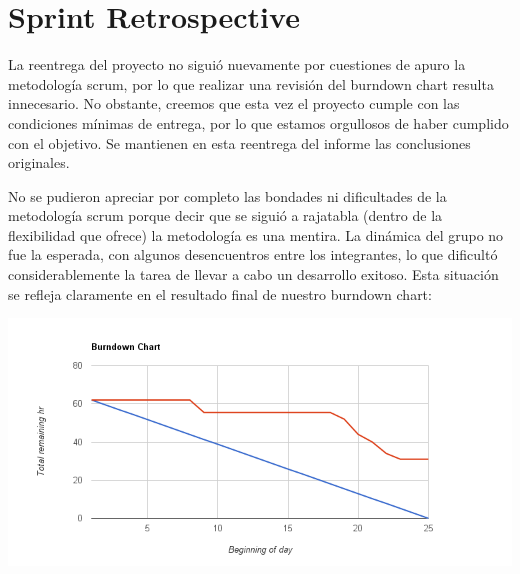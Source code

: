 \section{Sprint Retrospective}
La reentrega del proyecto no siguió nuevamente por cuestiones de apuro la metodología scrum, por lo que realizar una revisión del burndown chart resulta innecesario. No obstante, creemos que esta vez el proyecto cumple con las condiciones mínimas de entrega, por lo que estamos orgullosos de haber cumplido con el objetivo. Se mantienen en esta reentrega del informe las conclusiones originales.

No se pudieron apreciar por completo las bondades ni dificultades de la metodología scrum porque decir que se siguió a rajatabla (dentro de la flexibilidad que ofrece) la metodología es una mentira. La dinámica del grupo no fue la esperada, con algunos desencuentros entre los integrantes, lo que dificultó considerablemente la tarea de llevar a cabo un desarrollo exitoso.
Esta situación se refleja claramente en el resultado final de nuestro burndown chart:

\begin{center}
\includegraphics[scale=0.4]{burndown.png} 
\end{center}

